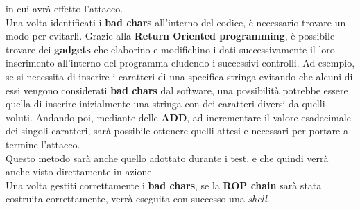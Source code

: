 in cui avrà effetto l'attacco.\\
Una volta identificati i \textbf{bad chars} all'interno del codice, è necessario trovare un modo per evitarli. Grazie alla \textbf{Return Oriented programming}, è possibile trovare dei \textbf{gadgets} che elaborino e modifichino i dati successivamente il loro inserimento all'interno del programma eludendo i successivi controlli.
Ad esempio, se si necessita di inserire i caratteri di una specifica stringa evitando che alcuni di essi vengono considerati \textbf{bad chars} dal software, una possibilità potrebbe essere quella di inserire inizialmente una stringa con dei caratteri diversi da quelli voluti. Andando poi, mediante delle \textbf{ADD}, ad incrementare il valore 
esadecimale dei singoli caratteri, sarà possibile ottenere quelli attesi e necessari per portare a termine l'attacco.\\
Questo metodo sarà anche quello adottato durante i test, e che quindi verrà anche visto direttamente in azione.\\
Una volta gestiti correttamente i \textbf{bad chars}, se la \textbf{ROP chain} sarà stata costruita correttamente, verrà eseguita con successo una \textit{shell}.

